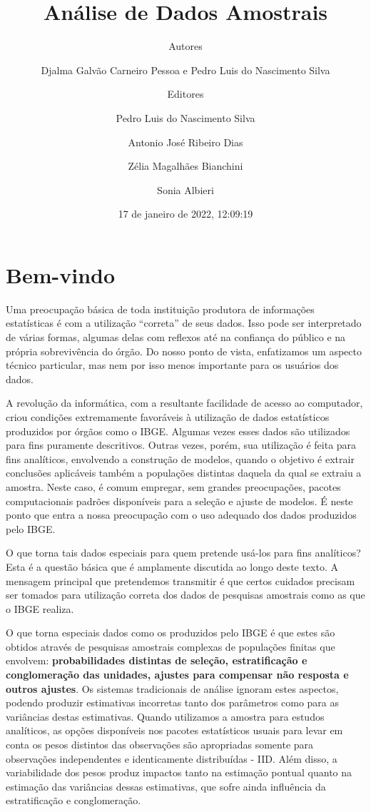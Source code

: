 \documentclass[
  12pt,
  brazilian,
]{book}
\title{Análise de Dados Amostrais}
\author{Autores \and Djalma Galvão Carneiro Pessoa e Pedro Luis do Nascimento Silva \and Editores \and Pedro Luis do Nascimento Silva \and Antonio José Ribeiro Dias \and Zélia Magalhães Bianchini \and Sonia Albieri}
\date{17 de janeiro de 2022, 12:09:19}
\theoremstyle{definition}
\theoremstyle{definition}
\theoremstyle{definition}
\theoremstyle{definition}
\theoremstyle{remark}
\begin{document}
\maketitle

{
\setcounter{tocdepth}{1}
\tableofcontents
}
\hypertarget{bem-vindo}{%
\chapter*{Bem-vindo}\label{bem-vindo}}

Uma preocupação básica de toda instituição produtora de informações estatísticas é com a utilização ``correta'' de seus dados. Isso pode ser interpretado de várias formas, algumas delas com reflexos até na confiança do público e na
própria sobrevivência do órgão. Do nosso ponto de vista, enfatizamos um aspecto
técnico particular, mas nem por isso menos importante para os usuários dos dados.

A revolução da informática, com a resultante facilidade de acesso ao computador, criou condições extremamente favoráveis à utilização de dados estatísticos produzidos por órgãos como o IBGE. Algumas vezes esses dados são utilizados para fins puramente descritivos. Outras vezes, porém, sua utilização é feita para fins analíticos, envolvendo a construção de modelos, quando o objetivo é extrair conclusões aplicáveis também a populações distintas daquela da qual se extraiu a amostra. Neste caso, é comum empregar, sem grandes preocupações, pacotes
computacionais padrões disponíveis para a seleção e ajuste de modelos. É neste ponto que entra a nossa preocupação com o uso adequado dos dados produzidos pelo IBGE.

O que torna tais dados especiais para quem pretende usá-los para fins
analíticos? Esta é a questão básica que é amplamente discutida ao longo deste texto. A mensagem principal que pretendemos transmitir é que certos cuidados precisam ser tomados para utilização correta dos dados de pesquisas amostrais como as que o IBGE realiza.

O que torna especiais dados como os produzidos pelo IBGE é que estes são obtidos através de pesquisas amostrais complexas de populações finitas que envolvem: \textbf{probabilidades distintas de seleção, estratificação e conglomeração das unidades, ajustes para compensar não resposta e outros ajustes}. Os sistemas
tradicionais de análise ignoram estes aspectos, podendo produzir estimativas incorretas tanto dos parâmetros como para as variâncias destas estimativas. Quando utilizamos a amostra para estudos analíticos, as opções disponíveis nos pacotes estatísticos usuais para levar em conta os pesos distintos das observações são apropriadas somente para observações independentes e identicamente distribuídas - IID. Além disso, a variabilidade dos pesos produz
impactos tanto na estimação pontual quanto na estimação das variâncias dessas estimativas, que sofre ainda influência da estratificação e conglomeração.
\end{document}
